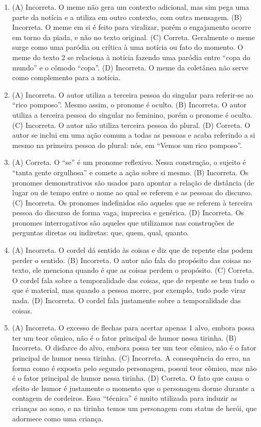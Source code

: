 \begin{enumerate}
\item (A) Incorreta. O meme não gera um contexto adicional, mas sim pega uma
parte da notícia e a utiliza em outro contexto, com outra mensagem.
(B) Incorreta. O meme em si é feito para viralizar, porém o engajamento
ocorre em torno da piada, e não no texto original.
(C) Correta. Geralmente o meme surge como uma paródia ou crítica à uma
notícia ou fato do momento. O meme do texto 2 se relaciona à notícia
fazendo uma paródia entre ``copa do mundo'' e o cômodo ``copa''.
(D) Incorreta. O meme da coletânea não serve como complemento para a
notícia.

\item (A) Incorreta. O autor utiliza a terceira pessoa do singular para
referir-se ao ``rico pomposo''. Mesmo assim, o pronome é oculto.
(B) Incorreta. O autor utiliza a terceira pessoa do singular no feminino,
porém o pronome é oculto.
(C) Incorreta. O autor não utiliza terceira pessoa do plural.
(D) Correta. O autor se inclui em uma ação comum a todas as pessoas e
acaba referindo a si mesmo na primeira pessoa do plural: nós, em ``Vemos
um rico pomposo''.

\item (A) Correta. O ``se'' é um pronome reflexivo. Nessa construção, o sujeito
é ``tanta gente orgulhosa'' e comete a ação sobre si mesmo.
(B) Incorreta. Os pronomes demonstrativos são usados para apontar a
relação de distância (de lugar ou de tempo entre o nome ao qual se
referem e as pessoas do discurso.
(C) Incorreta. Os pronomes indefinidos são aqueles que se referem à
terceira pessoa do discurso de forma vaga, imprecisa e genérica.
(D) Incorreta. Os pronomes interrogativos são aqueles que utilizamos nas
construções de perguntas diretas ou indiretas: que, quem, qual, quanto.

\item (A) Incorreta. O cordel dá sentido às coisas e diz que de repente elas
podem perder o sentido.
(B) Incorreta. O autor não fala do propósito das coisas no texto, ele
menciona quando é que as coisas perdem o propósito.
(C) Correta. O cordel fala sobre a temporalidade das coisas, que de
repente se tem tudo o que é material, mas quando a pessoa morre, por
exemplo, tudo pode virar nada.
(D) Incorreta. O cordel fala justamente sobre a temporalidade das coisas.

\item (A) Incorreta. O excesso de flechas para acertar apenas 1 alvo, embora
possa ter um teor cômico, não é o fator principal de humor nessa
tirinha.
(B) Incorreta. O disfarce do alvo, embora possa ter um teor cômico, não é
o fator principal de humor nessa tirinha.
(C) Incorreta. A consequência do erro, na forma como é exposta pelo
segundo personagem, possui teor cômico, mas não é o fator principal de
humor nessa tirinha.
(D) Correta. O fato que causa o efeito de humor é justamente o momento
que o personagem dorme durante a contagem de cordeiros. Essa ``técnica''
é muito utilizada para induzir as crianças ao sono, e na tirinha temos
um personagem com status de herói, que adormece como uma criança.


\end{enumerate}
